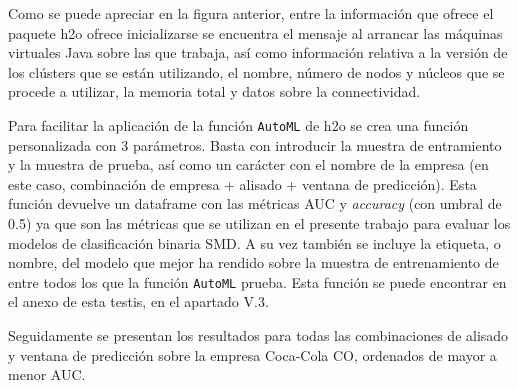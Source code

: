 \documentclass[]{DissertateUSU}
\begin{document}
\setlength\parskip{5ex}
\justifying

\noindent Como se puede apreciar en la figura anterior, entre la
información que ofrece el paquete h2o ofrece inicializarse se encuentra
el mensaje al arrancar las máquinas virtuales Java sobre las que
trabaja, así como información relativa a la versión de los clústers que
se están utilizando, el nombre, número de nodos y núcleos que se procede
a utilizar, la memoria total y datos sobre la connectividad.

\noindent Para facilitar la aplicación de la función \texttt{AutoML} de
h2o se crea una función personalizada con 3 parámetros. Basta con
introducir la muestra de entramiento y la muestra de prueba, así como un
carácter con el nombre de la empresa (en este caso, combinación de
empresa + alisado + ventana de predicción). Esta función devuelve un
dataframe con las métricas AUC y \emph{accuracy} (con umbral de 0.5) ya
que son las métricas que se utilizan en el presente trabajo para evaluar
los modelos de clasificación binaria SMD. A su vez también se incluye la
etiqueta, o nombre, del modelo que mejor ha rendido sobre la muestra de
entrenamiento de entre todos los que la función \texttt{AutoML} prueba.
Esta función se puede encontrar en el anexo de esta testis, en el
apartado V.3.

\noindent Seguidamente se presentan los resultados para todas las
combinaciones de alisado y ventana de predicción sobre la empresa
Coca-Cola CO, ordenados de mayor a menor AUC.
\end{document}
